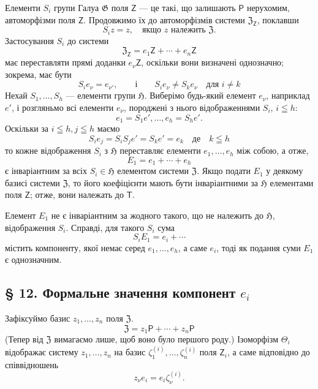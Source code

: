 \documentclass[11pt]{article}
\begin{document}
Елементи \(S_i\) групи Галуа \(\mathfrak G\) поля \(\mathsf Z\) --- це такі, що залишають \(\mathsf P\) нерухомим, автоморфізми поля \(\mathsf Z\). Продовжимо їх до автоморфізмів системи \(\mathfrak Z_{\mathsf Z}\), поклавши
\[
S_i z=z,\quad \text{якщо } z \text{ належить } \mathfrak Z.
\]
Застосування \(S_i\) до системи
\[
\mathfrak Z_{\mathsf Z}=e_1\mathsf Z+\cdots+e_n\mathsf Z
\]
має переставляти прямі доданки \(e_\nu\mathsf Z\), оскільки вони визначені однозначно; зокрема, має бути
\[
S_i e_\nu=e_{\nu'},\qquad\text{і}\qquad S_i e_\nu\ne S_k e_\nu
\quad\text{для } i\ne k
\]
Нехай \(S_1,\ldots,S_h\) --- елементи групи \(\mathfrak H\). Виберімо будь-який елемент \(e_\nu\), наприклад \(e'\), і розгляньмо всі елементи \(e_\nu\), породжені з нього відображеннями \(S_i\), \(i\leqq h\):
\[
e_1=S_1e',\ldots,e_h=S_he'.
\]
Оскільки за \(i\leqq h, j\leqq h\) маємо
\[
S_i e_j=S_iS_j e'=S_ke'=e_k \quad \text{де}\quad k\leqq h
\]
то кожне відображення \(S_i\) з \(\mathfrak H\) переставляє елементи \(e_1,\ldots,e_h\) між собою, а отже,
\[
E_1=e_1+\cdots+e_h
\]
є інваріантним за всіх \(S_i\in\mathfrak H\) елементом системи \(\mathfrak Z\). Якщо подати \(E_1\) у деякому базисі системи \(\mathfrak Z\), то його коефіцієнти мають бути інваріантними за \(\mathfrak H\) елементами поля \(\mathsf Z\); отже, вони належать до \(\mathsf T\).

Елемент \(E_1\) не є інваріантним за жодного такого, що не належить до \(\mathfrak H\), відображення \(S_i\). Справді, для такого \(S_i\) сума
\[
S_i E_1=e_i+\cdots
\]
містить компоненту, якої немає серед \(e_1,\ldots,e_h\), а саме \(e_i\), тоді як подання суми \(E_1\) є однозначним.

\subsection*{§ 12. Формальне значення компонент \(e_i\)}\label{die-formale-bedeutung-der-komponenten-ei}

Зафіксуймо базис \(z_1,\ldots,z_n\) поля \(\mathfrak Z\).
\[
\mathfrak Z=z_1\mathsf P+\cdots+z_n\mathsf P
\]
(Тепер від \(\mathfrak Z\) вимагаємо лише, щоб воно було першого роду.) Ізоморфізм \(\Theta_i\) відображає систему \(z_1,\ldots,z_n\) на базис \(\zeta_1^{(i)},\ldots,\zeta_n^{(i)}\) поля \(\mathsf Z_i\), а саме відповідно до співвідношень
\[
z_\nu e_i=e_i\zeta_\nu^{(i)} .
\]
\end{document}
